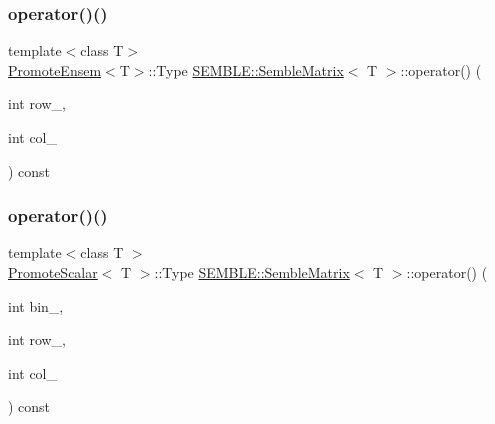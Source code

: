 \mbox{\label{structSEMBLE_1_1SembleMatrix_ac971ccfb246830b41dc70f8003281cae}} 
\subsubsection{\texorpdfstring{operator()()}{operator()()}\hspace{0.1cm}{\footnotesize\ttfamily [2/4]}}
{\footnotesize\ttfamily template$<$class T$>$ \\
\mbox{\hyperlink{structSEMBLE_1_1PromoteEnsem}{Promote\+Ensem}}$<$T$>$\+::Type \mbox{\hyperlink{structSEMBLE_1_1SembleMatrix}{S\+E\+M\+B\+L\+E\+::\+Semble\+Matrix}}$<$ T $>$\+::operator() (\begin{DoxyParamCaption}\item[{int}]{row\+\_\+,  }\item[{int}]{col\+\_\+ }\end{DoxyParamCaption}) const\hspace{0.3cm}{\ttfamily [inline]}}

\mbox{\label{structSEMBLE_1_1SembleMatrix_abebebe665ebbe033993dbc10e29c73e3}} 
\subsubsection{\texorpdfstring{operator()()}{operator()()}\hspace{0.1cm}{\footnotesize\ttfamily [3/4]}}
{\footnotesize\ttfamily template$<$class T $>$ \\
\mbox{\hyperlink{structSEMBLE_1_1PromoteScalar}{Promote\+Scalar}}$<$ T $>$\+::Type \mbox{\hyperlink{structSEMBLE_1_1SembleMatrix}{S\+E\+M\+B\+L\+E\+::\+Semble\+Matrix}}$<$ T $>$\+::operator() (\begin{DoxyParamCaption}\item[{int}]{bin\+\_\+,  }\item[{int}]{row\+\_\+,  }\item[{int}]{col\+\_\+ }\end{DoxyParamCaption}) const}

